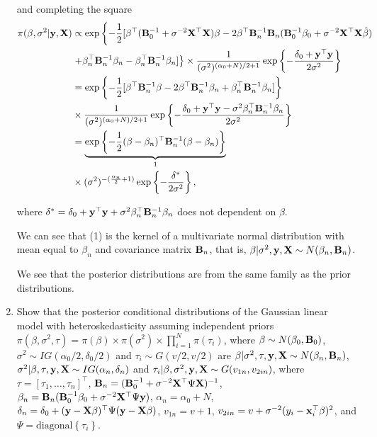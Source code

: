 \begin{enumerate}[leftmargin=*]
and completing the square
\begin{align*}
	\pi(\beta, \sigma^2|{\bf{y}}, {\bf{X}}) & \propto \exp\left\{-\frac{1}{2}[\beta^{\top}({\bf{B}}_0^{-1}+\sigma^{-2} {\bf{X}}^{\top}{\bf{X}})\beta-2\beta^{\top}{\bf{B}}_n^{-1}{\bf{B}}_n({\bf{B}}_0^{-1}\beta_0+\sigma^{-2}{\bf{X}}^{\top}{\bf{X}}\hat{\beta})\right.\\
	&\left.+\beta^{\top}_n{\bf{B}}_n^{-1}\beta_n-\beta_n^{\top}{\bf{B}}_n^{-1}\beta_n]\right\}\times\frac{1}{(\sigma^2)^{(\alpha_0+N)/2+1}}\exp\left\{-\frac{\delta_0+{\bf{y}}^{\top}{\bf{y}}}{2\sigma^2}\right\}\\
	&=\exp\left\{-\frac{1}{2}[\beta^{\top}{\bf{B}}_n^{-1}\beta-2\beta^{\top}{\bf{B}}_n^{-1}\beta_n+\beta_n^{\top}{\bf{B}}_n^{-1}\beta_n]\right\}\\
	& \times\frac{1}{(\sigma^2)^{(\alpha_0+N)/2+1}}\exp\left\{-\frac{\delta_0+{\bf{y}}^{\top}{\bf{y}}-\sigma^2\beta_n^{\top}{\bf{B}}_n^{-1}\beta_n}{2\sigma^2}\right\}\\
	&=\underbrace{\exp\left\{-\frac{1}{2}(\beta-\beta_n)^{\top}{\bf{B}}_n^{-1}(\beta-\beta_n)\right\}}_1\\
	&\times(\sigma^2)^{-(\frac{\alpha_n}{2}+1)}\exp\left\{-\frac{\delta^{\ast}}{2\sigma^2}\right\},
\end{align*}

where $\delta^{\ast}=\delta_0+{\bf{y}}^{\top}{\bf{y}}+\sigma^2\beta^{\top}_n{\bf{B}}_n^{-1}\beta_n$ does not dependent on $\beta$.

We can see that (1) is the kernel of a multivariate normal distribution with mean equal to $\beta_n$ and covariance matrix ${\bf{B}}_n$, that is, $\beta|\sigma^2,{\bf{y}},{\bf{X}}\sim N(\beta_n,{\bf{B}}_n)$. 

We see that the posterior distributions are from the same family as the prior distributions.

\item Show that the posterior conditional distributions of the Gaussian linear model with heteroskedasticity assuming independent priors $\pi(\beta,\sigma^2,\tau)=\pi(\beta)\times\pi(\sigma^2)\times\prod_{i=1}^N\pi(\tau_i)$, where $\beta \sim N(\beta_0, {\bf{B}}_0)$, $\sigma^2 \sim IG(\alpha_0/2, \delta_0/2)$ and $\tau_i\sim G(v/2,v/2)$ are $\beta|\sigma^2,\tau,{\bf{y}},{\bf{X}}\sim N(\beta_n,{\bf{B}}_n)$, $\sigma^2|\beta,\tau,{\bf{y}},{\bf{X}}\sim IG(\alpha_n,\delta_n)$ and $\tau_i|\beta,\sigma^2,{\bf{y}},{\bf{X}}\sim G(v_{1n},v_{2in})$, where $\tau=[\tau_1,\dots,\tau_n]^{\top}$, ${\bf{B}}_n=({\bf{B}}_0^{-1}+\sigma^{-2}{{\bf{X}}}^{\top}\Psi{{\bf{X}}})^{-1}$, $\beta_n={\bf{B}}_n({\bf{B}}_0^{-1}\beta_0+\sigma^{-2}{\bf{X}}^{\top}\Psi{\bf{y}})$, $\alpha_n=\alpha_0+N$, $\delta_n=\delta_0+({\bf{y}}-{\bf{X}}\beta)^{\top}\Psi({\bf{y}}-{\bf{X}}\beta)$, $v_{1n}=v+1$, $v_{2in}=v+\sigma^{-2}(y_i-{\bf{x}}_i^{\top}\beta)^2$, and $\Psi=\text{diagonal}\left\{\tau_i\right\}$.


\end{enumerate}
